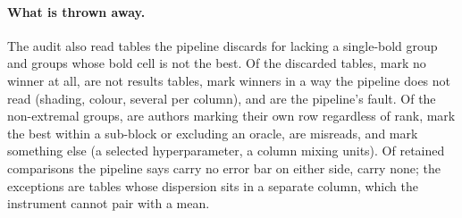 \documentclass{article}
\begin{document}
\paragraph{What is thrown away.} The audit also read \nGoldDiscardedN{} tables
the pipeline discards for lacking a single-bold group and \nGoldNonExtN{}
groups whose bold cell is not the best. Of the discarded tables,
\nGoldDiscardedNoBold{} mark no winner at all, \nGoldDiscardedNotResults{} are
not results tables, \nGoldDiscardedOther{} mark winners in a way the pipeline
does not read (shading, colour, several per column), and \nGoldDiscardedFault{}
are the pipeline's fault. Of the non-extremal groups, \nGoldNonExtOwn{} are
authors marking their own row regardless of rank, \nGoldNonExtSub{} mark the
best within a sub-block or excluding an oracle, \nGoldNonExtFault{} are
misreads, and \nGoldNonExtOther{} mark something else (a selected
hyperparameter, a column mixing units). Of \nGoldNoBarN{} retained comparisons the pipeline says carry no
error bar on either side, \nGoldNoBarAbsent{} carry none; the exceptions are
tables whose dispersion sits in a separate column, which the instrument
cannot pair with a mean.
\end{document}
